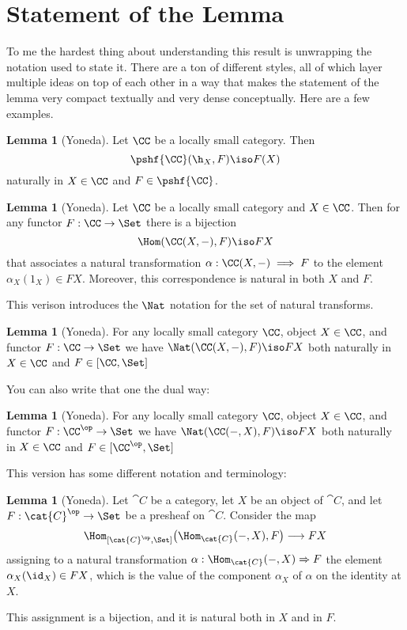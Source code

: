 \documentclass[12pt]{article}
\theoremstyle{definition}
\newtheorem{lemma}[thm]{Lemma}
\theoremstyle{definition}
\theoremstyle{definition}
\numberwithin{equation}{section}
\begin{document}
\section{Statement of the Lemma}

To me the hardest thing about understanding this result is unwrapping the notation used to state it.
There are a ton of different styles, all of which layer multiple ideas on top of each other in a way that
makes the statement of the lemma very compact textually and very dense conceptually. Here are a few examples.

\begin{lemma}[Yoneda]   
\label{yoneda1}
Let $\CC$ be a locally small category.  Then
% 
\begin{equation}        
\label{eq:yoneda}
\pshf{\CC}(\h_X, F)
\iso
F(X)
\end{equation}
% 
naturally in $X \in \CC$ and $F \in \pshf{\CC}$.  
\end{lemma}

\begin{lemma}[Yoneda]\label{yoneda2} Let $\CC$ be a locally small category and $X \in
\CC$. Then for any functor $F : \CC \to \Set$ there is a bijection
$$
\Hom(\CC(X,-), F) \iso FX
$$
that associates a natural transformation $\alpha:\CC(X,-) \implies F$ to the element
$\alpha_X(1_X) \in FX$. Moreover, this correspondence is natural in both $X$ and $F$.
\end{lemma}

\noindent This verison introduces the $\Nat$ notation for the set of natural transforms.

\begin{lemma}[Yoneda]\label{yoneda3} For any locally small category $\CC$, object $X
\in \CC$, and functor $F:\CC \to \Set$ we have  $\Nat(\CC(X,-),F) \iso FX$
both naturally in $X \in \CC$ and $F \in [\CC, \Set]$
\end{lemma}

\noindent You can also write that one the dual way:
\begin{lemma}[Yoneda]\label{yoneda4} For any locally small category $\CC$, object
$X \in \CC$, and functor $F:\CC^{\op} \to \Set$ we have  $\Nat(\CC(-,X),F)
\iso FX$ both naturally in $X \in \CC$ and $F \in [\CC^{\op}, \Set]$
\end{lemma}

\noindent
This version has some different notation and terminology:

\begin{lemma}[Yoneda]\label{yoneda5}
 Let $\cat{C}$ be a category, let $X$ be an object of $\cat{C}$, and let $F:\cat{C}^\op\to\Set$ be a presheaf on $\cat{C}$. 
 Consider the map 
 $$
 \Hom_{[\cat{C}^\op,\Set]} \big( \Hom_\cat{C} (-,X) , F \big) \longrightarrow FX
 $$
 assigning to a natural transformation $\alpha:\Hom_\cat{C} (-,X)\Rightarrow F$ the element $\alpha_X(\id_X)\in FX$, which is the value of the component $\alpha_X$ of $\alpha$ on the identity at $X$. 

 This assignment is a bijection, and it is natural both in $X$ and in $F$.
\end{lemma}
\end{document}
